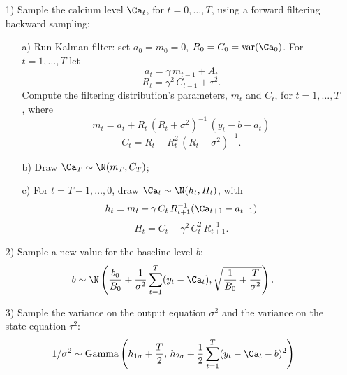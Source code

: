 \begin{enumerate}
	\item[1)] Sample the calcium level $\Ca_t$, for $t=0,\dots,T$, using a forward filtering backward sampling:
	\begin{itemize}
		\item[a)] Run Kalman filter: set $a_0 = m_0 = 0$, $R_0 = C_0 = \mathrm{var}(\Ca_0)$. For $t = 1,\dots,T$ let 
		\begin{equation*}
		a_t = \gamma \, m_{t-1} + A_t
		\end{equation*}
		\begin{equation*}
		R_t = \gamma^2 \, C_{t-1} + \tau^2.
		\end{equation*}
		Compute the filtering distribution's parameters, $m_t$ and $C_t$, for $t = 1,\dots,T$, where
		\begin{equation*}
		m_t = a_t + R_t\, (R_t + \sigma^2)^{-1} \, (y_t - b - a_t)
		\end{equation*}
		\begin{equation*}
		C_t = R_t -  R_t^2 \, (R_t + \sigma^2)^{-1}.
		\end{equation*}
		\item[b)] Draw $\Ca_T \sim \N(m_T, C_T)$;
		\item[c)] For $t = T-1, \dots, 0$, draw $\Ca_t \sim \N(h_t, H_t)$, with 
		\begin{equation*}
		h_t = m_t + \gamma \, C_t \, R_{t+1}^{-1} (\Ca_{t+1} - a_{t+1})
		\end{equation*}
		\begin{equation*}
		H_t = C_t - \gamma^2 \, C_t^2 \, R_{t+1}^{-1}.
		\end{equation*}
	\end{itemize}
	\item[2)] Sample a new value for the baseline level $b$: 
	\begin{equation*}
	b  \sim \N \left( \frac{b_0}{B_0} + \frac{1}{\sigma^2} \sum_{t=1}^T(y_t - \Ca_t), \sqrt{\frac{1}{B_0} + \frac{T}{\sigma^2}} \right).
	\end{equation*}
	\item[3)] Sample the variance on the output equation $\sigma^2$ and the variance on the state equation $\tau^2$:
	\begin{equation*}
	1/\sigma^2 \sim \mathrm{Gamma} \left( h_{1\sigma} + \frac{T}{2},\, h_{2\sigma} + \frac{1}{2} \sum_{t=1}^T (y_t - \Ca_t - b)^2 \right)
	\end{equation*}
	\begin{equation*}

\end{equation*}
\end{enumerate}
